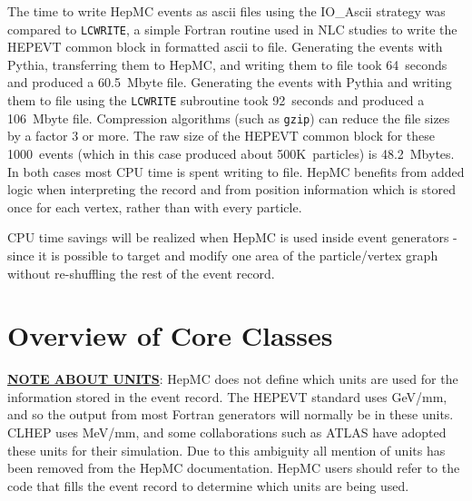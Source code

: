 \documentclass[11pt,letterpaper]{article}
\begin{document}
The time to write HepMC events as ascii files using the IO\_Ascii
strategy was compared to \verb!LCWRITE!, a simple Fortran routine used
in NLC studies to write the HEPEVT common block in formatted ascii to file.
Generating the events with Pythia, transferring them to HepMC, and
writing them to file took 64~seconds and produced a 60.5~Mbyte file.
Generating the events with Pythia and writing them to file using the
\verb!LCWRITE! subroutine took 92~seconds and produced a 106~Mbyte
file. Compression algorithms (such as \verb!gzip!) can reduce the file
sizes by a factor 3 or more.  The raw size of the HEPEVT common block
for these 1000~events (which in this case produced about 500K~particles) is
48.2~Mbytes.  In both cases most CPU time is spent writing to file.
HepMC benefits from added logic when interpreting the record and from 
position information which is stored once for each vertex, rather than
with every particle.  

CPU time savings will be realized when HepMC is
used inside event generators - since it is possible to target and
modify one area of the particle/vertex graph without re-shuffling the
rest of the event record.

%
%
\section{Overview of Core Classes}

\underline{\bf NOTE ABOUT UNITS}:
HepMC does not define which units are used for the information stored
in the event record.
The HEPEVT standard uses GeV/mm, and so the output from most Fortran
generators will normally be in these units.
CLHEP uses MeV/mm, and some collaborations such as ATLAS
have adopted these units for their simulation.
Due to this ambiguity all mention of units has been removed from 
the HepMC documentation.  
HepMC users should refer to the code that fills the event record 
to determine which units are being used.

%
%
\end{document}
